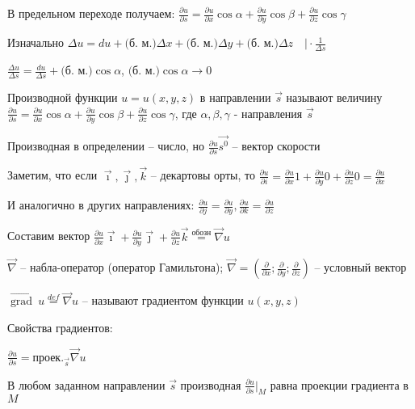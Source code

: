 \documentclass[12pt]{article}
\begin{document}
    В предельном переходе получаем: $\frac{\partial u}{\partial s} = \frac{\partial u}{\partial x} \cos\alpha + \frac{\partial u}{\partial y} \cos\beta + \frac{\partial u}{\partial z} \cos\gamma$

    \Nota Изначально $\Delta u = du + \text{(б. м.)} \Delta x + \text{(б. м.)} \Delta y + \text{(б. м.)} \Delta z \quad \Big| \cdot \frac{1}{\Delta s}$

    $\frac{\Delta u}{\Delta s} = \frac{du}{\Delta s} + \text{(б. м.)} \cos\alpha$, $\text{(б. м.)} \cos\alpha \rightarrow 0$

    \hypertarget{derivativeoffunctionindirection}{}

    \Def Производной функции $u = u(x, y, z)$ в направлении $\vec{s}$ называют величину $\frac{\partial u}{\partial s} = \frac{\partial u}{\partial x} \cos\alpha + \frac{\partial u}{\partial y} \cos\beta + \frac{\partial u}{\partial z} \cos\gamma$, где $\alpha, \beta, \gamma$ - направления $\vec{s}$

    \Nota Производная в определении -- число, но $\frac{\partial u}{\partial s} \vec{s^0}$ -- вектор скорости

    \Nota Заметим, что если $\vec \imath, \vec \jmath, \vec{k}$ -- декартовы орты, то
    $\frac{\partial u}{\partial i} = \frac{\partial u}{\partial x} 1 + \frac{\partial u}{\partial y} 0 + \frac{\partial u}{\partial z} 0 = \frac{\partial u}{\partial x}$

    И аналогично в других направлениях: $\frac{\partial u}{\partial j} = \frac{\partial u}{\partial y}, \frac{\partial u}{\partial k} = \frac{\partial u}{\partial z}$

    Составим вектор $\frac{\partial u}{\partial x} \vec \imath + \frac{\partial u}{\partial y} \vec \jmath + \frac{\partial u}{\partial z} \vec k \stackrel{\text{обозн}}{=} \vec\nabla u$

    \hypertarget{gradientdefinition}{}

    $\vec\nabla$ -- набла-оператор (оператор Гамильтона); $\vec\nabla = \left(\frac{\partial}{\partial x}; \frac{\partial}{\partial y}; \frac{\partial}{\partial z}\right)$ -- условный вектор

    \Def $\overrightarrow{\operatorname{grad}} \ u \stackrel{def}{=} \vec\nabla u$ -- называют градиентом функции $u(x, y, z)$

    \hypertarget{gradientproperties}{}

    Свойства градиентов:

    \begin{MyTheorem}
         $\frac{\partial u}{\partial s} = \text{проек.}_{\vec{s}} \vec\nabla u$

        В любом заданном направлении $\overrightarrow{s}$ производная $\frac{\partial u}{\partial s} |_M$ равна проекции градиента в $M$
    \end{MyTheorem}
\end{document}
